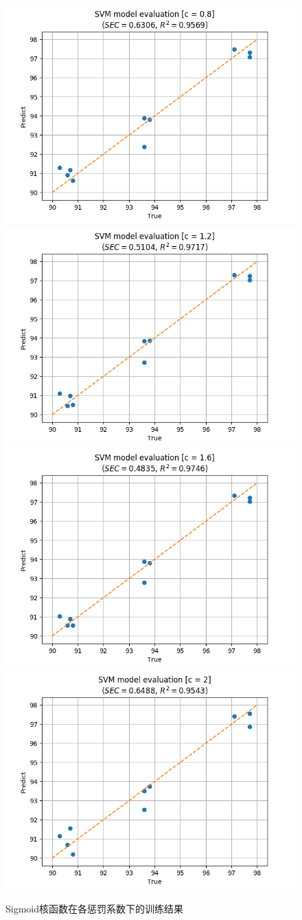 \documentclass[a4paper]{article}
\begin{document}
			
			\begin{figure}
				\begin{minipage}{\linewidth}
					\includegraphics[width=0.5\linewidth]{../img/svm_result_t3_c0_8}
					\includegraphics[width=0.5\linewidth]{../img/svm_result_t3_c1_2}
					\includegraphics[width=0.5\linewidth]{../img/svm_result_t3_c1_6}
					\includegraphics[width=0.5\linewidth]{../img/svm_result_t3_c2}
				\end{minipage}
				\caption{Sigmoid核函数在各惩罚系数下的训练结果}
				\label{fig:svm_result_c}
			\end{figure}
			
\end{document}
